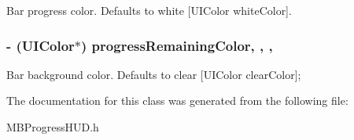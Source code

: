Bar progress color. Defaults to white \mbox{[}U\+I\+Color white\+Color\mbox{]}. \hypertarget{interface_m_b_bar_progress_view_a0529e715ce6e40bf0e09864ba0ca1219}{
\subsubsection[{progress\+Remaining\+Color}]{\setlength{\rightskip}{0pt plus 5cm}-\/ (U\+I\+Color$\ast$) progress\+Remaining\+Color\hspace{0.3cm}{\ttfamily [read]}, {\ttfamily [write]}, {\ttfamily [nonatomic]}, {\ttfamily [assign]}}}\label{interface_m_b_bar_progress_view_a0529e715ce6e40bf0e09864ba0ca1219}
Bar background color. Defaults to clear \mbox{[}U\+I\+Color clear\+Color\mbox{]}; 

The documentation for this class was generated from the following file\+:\begin{DoxyCompactItemize}
\item 
M\+B\+Progress\+H\+U\+D.\+h\end{DoxyCompactItemize}

